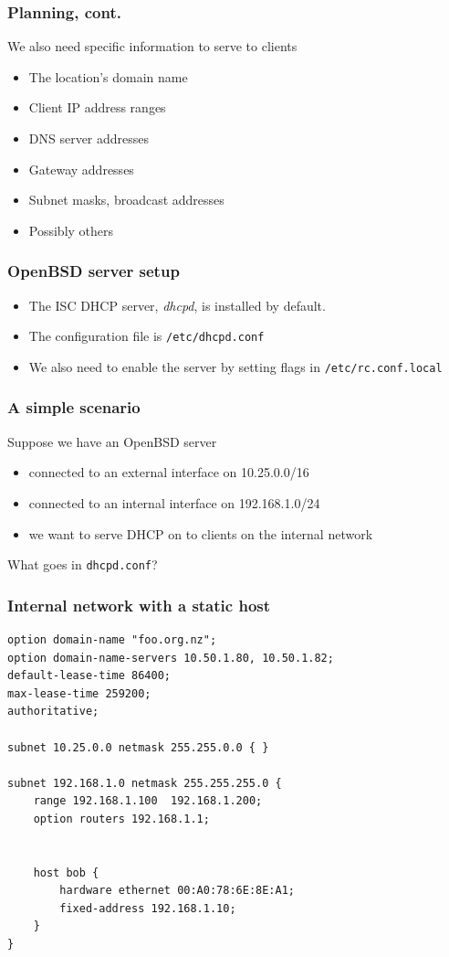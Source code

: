 \documentclass[10pt]{beamer}
\begin{document}
\begin{frame}
	\frametitle{Planning, cont.}
	
	We also need specific information to serve to clients
	\begin{itemize}
		\item The location's domain name
		\item Client IP address ranges
		\item DNS server addresses
		\item Gateway addresses
		\item Subnet masks, broadcast addresses
		\item Possibly others
	\end{itemize}  
\end{frame}


\begin{frame}
	\frametitle{OpenBSD server setup}
	\begin{itemize}
		\item The ISC DHCP server, \emph{dhcpd}, is installed by default.
		\item The configuration file is \texttt{/etc/dhcpd.conf}
		\item We also need to enable the server by setting flags in \texttt{/etc/rc.conf.local}
	\end{itemize}  
\end{frame}

\begin{frame}
	\frametitle{A simple scenario}
	Suppose we have an OpenBSD server 
	\begin{itemize}
		\item connected to an external interface on 10.25.0.0/16
		\item connected to an internal interface on 192.168.1.0/24
		\item we want to serve DHCP on to clients on the internal network
	\end{itemize}  
	
	What goes in \texttt{dhcpd.conf}?
\end{frame}

\begin{frame}[fragile]
	\frametitle{Internal network with a static host}
	\begin{verbatim}
option domain-name "foo.org.nz";
option domain-name-servers 10.50.1.80, 10.50.1.82;
default-lease-time 86400;
max-lease-time 259200;
authoritative;

subnet 10.25.0.0 netmask 255.255.0.0 { }

subnet 192.168.1.0 netmask 255.255.255.0 {
    range 192.168.1.100  192.168.1.200;
    option routers 192.168.1.1;
    

    host bob {
        hardware ethernet 00:A0:78:6E:8E:A1;
        fixed-address 192.168.1.10;
    }
}
	
	\end{verbatim}
\end{frame}
\end{document}
